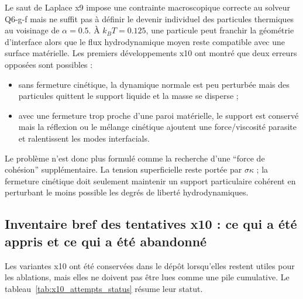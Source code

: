 \documentclass[11pt,a4paper]{article}
\begin{document}
Le saut de Laplace x9 impose une contrainte macroscopique correcte au solveur Q6-g-f mais ne suffit pas à définir le devenir individuel des particules thermiques au voisinage de $\alpha=0.5$. À $k_BT=0.125$, une particule peut franchir la géométrie d'interface alors que le flux hydrodynamique moyen reste compatible avec une surface matérielle. Les premiers développements x10 ont montré que deux erreurs opposées sont possibles :
\begin{itemize}[leftmargin=2em]
  \item sans fermeture cinétique, la dynamique normale est peu perturbée mais des particules quittent le support liquide et la masse se disperse ;
  \item avec une fermeture trop proche d'une paroi matérielle, le support est conservé mais la réflexion ou le mélange cinétique ajoutent une force/viscosité parasite et ralentissent les modes interfacials.
\end{itemize}
Le problème n'est donc plus formulé comme la recherche d'une ``force de cohésion'' supplémentaire. La tension superficielle reste portée par $\sigma\kappa$ ; la fermeture cinétique doit seulement maintenir un support particulaire cohérent en perturbant le moins possible les degrés de liberté hydrodynamiques.

\subsection{Inventaire bref des tentatives x10 : ce qui a été appris et ce qui a été abandonné}

Les variantes x10 ont été conservées dans le dépôt lorsqu'elles restent utiles pour les ablations, mais elles ne doivent pas être lues comme une pile cumulative. Le tableau~\ref{tab:x10_attempts_status} résume leur statut.
\end{document}
